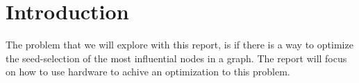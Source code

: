 \chapter{Introduction} 

The problem that we will explore with this report, is if there is a way to optimize the seed-selection of the most influential nodes in a graph. The report will focus on how to use hardware to achive an optimization to this problem. 